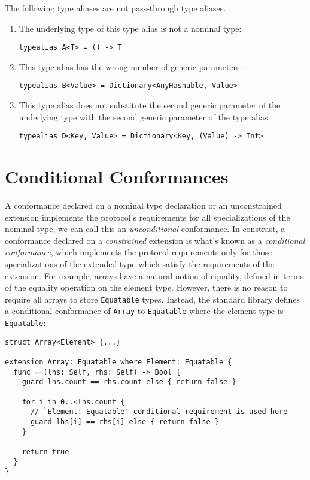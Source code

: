 \documentclass[../generics]{subfiles}
\begin{document}
\begin{example}
The following type aliases are not pass-through type aliases.
\begin{enumerate}
\item The underlying type of this type alias is not a nominal type:
\begin{verbatim}
typealias A<T> = () -> T
\end{verbatim}
\item This type alias has the wrong number of generic parameters:
\begin{verbatim}
typealias B<Value> = Dictionary<AnyHashable, Value>
\end{verbatim}
\item This type alias does not substitute the second generic parameter of the underlying type with the second generic parameter of the type alias:
\begin{verbatim}
typealias D<Key, Value> = Dictionary<Key, (Value) -> Int>
\end{verbatim}
\end{enumerate}
\end{example}

\section{Conditional Conformances}\label{conditional conformance}

A conformance declared on a nominal type declaration or an unconstrained extension implements the protocol's requirements for all specializations of the nominal type; we can call this an \emph{unconditional} conformance. In constrast, a conformance declared on a \emph{constrained} extension is what's known as a \emph{conditional conformance}, which implements the protocol requirements only for those specializations of the extended type which satisfy the requirements of the extension. For example, arrays have a natural notion of equality, defined in terms of the equality operation on the element type. However, there is no reason to require all arrays to store \texttt{Equatable} types. Instead, the standard library defines a conditional conformance of \texttt{Array} to \texttt{Equatable} where the element type is \texttt{Equatable}:
\begin{Verbatim}
struct Array<Element> {...}

extension Array: Equatable where Element: Equatable {
  func ==(lhs: Self, rhs: Self) -> Bool {
    guard lhs.count == rhs.count else { return false }

    for i in 0..<lhs.count {
      // `Element: Equatable' conditional requirement is used here
      guard lhs[i] == rhs[i] else { return false }
    }

    return true
  }
}
\end{Verbatim}
\end{document}
